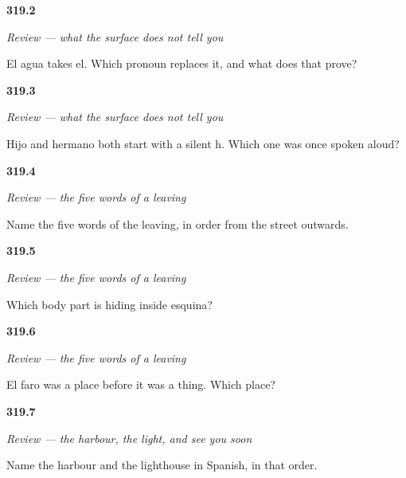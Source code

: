 \noindent\begin{minipage}[t]{\linewidth}
\raggedright
\hypertarget{review-ES-C319-repaso-la-superficie-pronoun}{\textbf{319.2}} \emph{Review — what the surface does not tell you}\par
\small El agua takes el. Which pronoun replaces it, and what does that prove?
\end{minipage}\par\medskip

\noindent\begin{minipage}[t]{\linewidth}
\raggedright
\hypertarget{review-ES-C319-repaso-la-superficie-hache}{\textbf{319.3}} \emph{Review — what the surface does not tell you}\par
\small Hijo and hermano both start with a silent h. Which one was once spoken aloud?
\end{minipage}\par\medskip

\noindent\begin{minipage}[t]{\linewidth}
\raggedright
\hypertarget{review-ES-C319-repaso-salir-order}{\textbf{319.4}} \emph{Review — the five words of a leaving}\par
\small Name the five words of the leaving, in order from the street outwards.
\end{minipage}\par\medskip

\noindent\begin{minipage}[t]{\linewidth}
\raggedright
\hypertarget{review-ES-C319-repaso-salir-shin}{\textbf{319.5}} \emph{Review — the five words of a leaving}\par
\small Which body part is hiding inside esquina?
\end{minipage}\par\medskip

\noindent\begin{minipage}[t]{\linewidth}
\raggedright
\hypertarget{review-ES-C319-repaso-salir-island}{\textbf{319.6}} \emph{Review — the five words of a leaving}\par
\small El faro was a place before it was a thing. Which place?
\end{minipage}\par\medskip

\noindent\begin{minipage}[t]{\linewidth}
\raggedright
\hypertarget{review-ES-C319-despedida-harbour}{\textbf{319.7}} \emph{Review — the harbour, the light, and see you soon}\par
\small Name the harbour and the lighthouse in Spanish, in that order.
\end{minipage}\par\medskip

